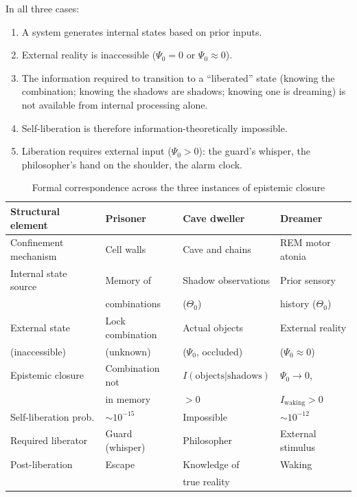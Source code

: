 In all three cases:
\begin{enumerate}
\item A system generates internal states based on prior inputs.
\item External reality is inaccessible ($\Psi_0 = 0$ or $\Psi_0 \approx 0$).
\item The information required to transition to a ``liberated'' state (knowing the combination; knowing the shadows are shadows; knowing one is dreaming) is not available from internal processing alone.
\item Self-liberation is therefore information-theoretically impossible.
\item Liberation requires external input ($\Psi_0 > 0$): the guard's whisper, the philosopher's hand on the shoulder, the alarm clock.
\end{enumerate}

\begin{table}[h!]
\centering
\caption{Formal correspondence across the three instances of epistemic closure}
\label{tab:equivalence}
\small
\begin{tabular}{llll}
\toprule
Structural element & Prisoner & Cave dweller & Dreamer \\
\midrule
Confinement mechanism & Cell walls & Cave and chains & REM motor atonia \\
Internal state source & Memory of & Shadow observations & Prior sensory \\
 & combinations & ($\Theta_0$) & history ($\Theta_0$) \\
External state & Lock combination & Actual objects & External reality \\
(inaccessible) & (unknown) & ($\Psi_0$, occluded) & ($\Psi_0 \approx 0$) \\
Epistemic closure & Combination not & $I(\text{objects}|\text{shadows})$ & $\Psi_0 \to 0$, \\
 & in memory & $> 0$ & $I_{\mathrm{waking}} > 0$ \\
Self-liberation prob. & $\sim 10^{-15}$ & Impossible & $\sim 10^{-12}$ \\
Required liberator & Guard (whisper) & Philosopher & External stimulus \\
Post-liberation & Escape & Knowledge of & Waking \\
 & & true reality & \\
\bottomrule
\end{tabular}
\end{table}

